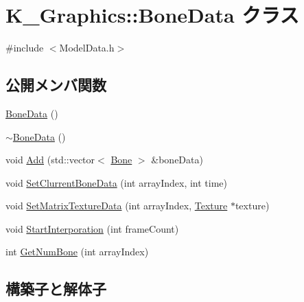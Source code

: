 \hypertarget{class_k___graphics_1_1_bone_data}{}\section{K\+\_\+\+Graphics\+:\+:Bone\+Data クラス}
\label{class_k___graphics_1_1_bone_data}


{\ttfamily \#include $<$Model\+Data.\+h$>$}

\subsection*{公開メンバ関数}
\begin{DoxyCompactItemize}
\item 
\mbox{\hyperlink{class_k___graphics_1_1_bone_data_a85dc211fe21cca0a722542a026cb661c}{Bone\+Data}} ()
\item 
\mbox{\hyperlink{class_k___graphics_1_1_bone_data_a98a5d1fcad5065855a955c2b49baea34}{$\sim$\+Bone\+Data}} ()
\item 
void \mbox{\hyperlink{class_k___graphics_1_1_bone_data_a5fe073eb7d0d22c43070db7eec940bd0}{Add}} (std\+::vector$<$ \mbox{\hyperlink{struct_k___graphics_1_1_bone}{Bone}} $>$ \&bone\+Data)
\item 
void \mbox{\hyperlink{class_k___graphics_1_1_bone_data_ab35b68473446fa8c476220c34b47cf5d}{Set\+Clurrent\+Bone\+Data}} (int array\+Index, int time)
\item 
void \mbox{\hyperlink{class_k___graphics_1_1_bone_data_a51bd89e02a538b588f0b9e620fa8dbcb}{Set\+Matrix\+Texture\+Data}} (int array\+Index, \mbox{\hyperlink{class_k___graphics_1_1_texture}{Texture}} $\ast$texture)
\item 
void \mbox{\hyperlink{class_k___graphics_1_1_bone_data_ae7ddd03ed42054dc910b098d80a0834b}{Start\+Interporation}} (int frame\+Count)
\item 
int \mbox{\hyperlink{class_k___graphics_1_1_bone_data_a3e6b8437e07517f3c0e924fa88f76467}{Get\+Num\+Bone}} (int array\+Index)
\end{DoxyCompactItemize}


\subsection{構築子と解体子}
\mbox{\label{class_k___graphics_1_1_bone_data_a85dc211fe21cca0a722542a026cb661c}} 
